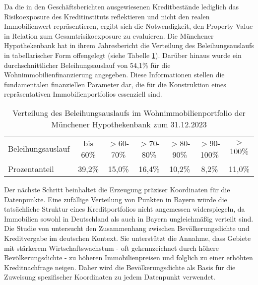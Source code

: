 \begin{sloppypar}
Da die in den Geschäftsberichten ausgewiesenen Kreditbestände lediglich das Risikoexposure des Kreditinstituts reflektieren und nicht den realen Immobilienwert repräsentieren, ergibt sich die Notwendigkeit, den Property Value in Relation zum Gesamtrisikoexposure zu evaluieren.
Die Münchener Hypothekenbank hat in ihrem Jahresbericht die Verteilung des Beleihungsauslaufs in tabellarischer Form offengelegt (siehe Tabelle \ref{tab:beleihungsauslauf2023}). Darüber hinaus wurde ein durchschnittlicher Beleihungsauslauf von 54,1\% für die Wohnimmobilienfinanzierung angegeben.
Diese Informationen stellen die fundamentalen finanziellen Parameter dar, die für die Konstruktion eines repräsentativen Immobilienportfolios essenziell sind.
\begin{table}[htbp]
    \centering
    \caption{Verteilung des Beleihungsauslaufs im Wohnimmobilienportfolio der Münchener Hypothekenbank zum 31.12.2023}
    \label{tab:beleihungsauslauf2023}
    \begin{tabular}{lcccccc}
    \toprule[0.5pt]
    Beleihungsauslauf & bis 60\% & $>$60-70\% & $>$70-80\% & $>$80-90\% & $>$90-100\% & $>$100\% \\
    Prozentanteil & 39,2\% & 15,0\% & 16,4\% & 10,2\% & 8,2\% & 11,0\% \\
    \bottomrule[1.5pt]
    \end{tabular}
\end{table}

Der nächste Schritt beinhaltet die Erzeugung präziser Koordinaten für die Datenpunkte. Eine zufällige Verteilung von Punkten in Bayern würde die tatsächliche Struktur eines Kreditportfolios nicht angemessen widerspiegeln, da Immobilien sowohl in Deutschland als auch in Bayern ungleichmäßig verteilt sind. Die Studie von \cite{zurek2022real} untersucht den Zusammenhang zwischen Bevölkerungsdichte und Kreditvergabe im deutschen Kontext. Sie unterstützt die Annahme, dass Gebiete mit stärkerem Wirtschaftswachstum - oft gekennzeichnet durch höhere Bevölkerungsdichte - zu höheren Immobilienpreisen und folglich zu einer erhöhten Kreditnachfrage neigen. Daher wird die Bevölkerungsdichte als Basis für die Zuweisung spezifischer Koordinaten zu jedem Datenpunkt verwendet.

\end{sloppypar}

